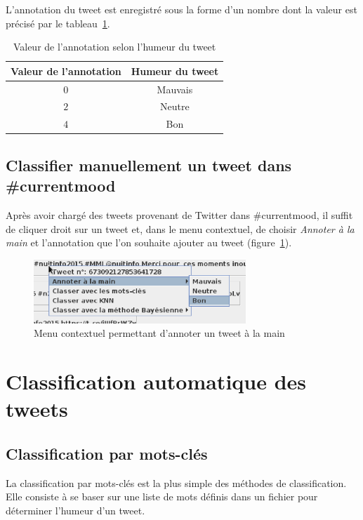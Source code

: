 \documentclass[12pt,a4paper]{report}
\newcommand{\CMName}{\#currentmood}
\begin{document}
L'annotation du tweet est enregistré sous la forme d'un nombre dont la valeur
est précisé par le tableau~\ref{tableau-valeurs-annotation}.

\begin{table}[h]
	\centering
	\begin{tabular}{c c}
		\textbf{Valeur de l'annotation}	& \textbf{Humeur du tweet}\\
		\midrule
		$0$				& Mauvais\\
		\midrule
		$2$				& Neutre\\
		\midrule
		$4$				& Bon
	\end{tabular}
	\caption{Valeur de l'annotation selon l'humeur du tweet}
	\label{tableau-valeurs-annotation}
\end{table}

\section{Classifier manuellement un tweet dans \CMName}
Après avoir chargé des tweets provenant de Twitter dans \CMName, il suffit de
cliquer droit sur un tweet et, dans le menu contextuel, de choisir
\textit{Annoter à la main} et l'annotation que l'on souhaite ajouter au tweet
(figure~\ref{capture-annoter-a-la-main}).

\begin{figure}[h]
	\centering
    \includegraphics[width=8cm]{img/capture-annoter-a-la-main.eps}
	\caption{Menu contextuel permettant d'annoter un tweet à la main}
	\label{capture-annoter-a-la-main}
\end{figure}

\chapter{Classification automatique des tweets}
\label{chapter-classifications}

\section{Classification par mots-clés}
La classification par mots-clés est la plus simple des méthodes de
classification. Elle consiste à se baser sur une liste de mots définis dans un
fichier pour déterminer l'humeur d'un tweet.
\end{document}
